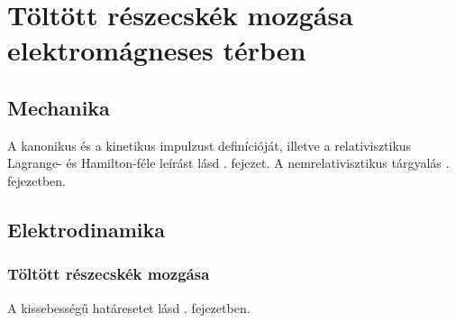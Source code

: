  \chapter{T\"olt\"ott r\'eszecsk\'ek mozg\'asa elektrom\'agneses t\'erben}
 
 \section{Mechanika} 
  
  A kanonikus és a kinetikus impulzust definícióját, illetve a relativisztikus Lagrange- és Hamilton-féle leírást lásd . fejezet. A nemrelativisztikus tárgyalás . fejezetben.
    
 \section{Elektrodinamika}
  
  \subsection{Töltött részecskék mozgása}
   
   A kissebességű határesetet lásd . fejezetben.
   
